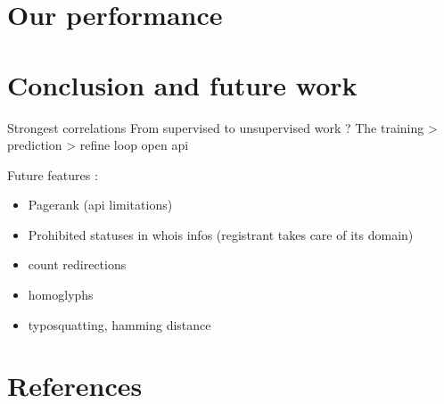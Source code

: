 \documentclass[conference,11pt]{IEEEtran}
\begin{document}
\section{Our performance}

\section{Conclusion and future work}
Strongest correlations
From supervised to unsupervised work ?
The training > prediction > refine loop
open api

Future features :
\begin{itemize}
  \item Pagerank (api limitations)
  \item Prohibited statuses in whois infos (registrant takes care of its domain)
  \item count redirections
  \item homoglyphs
  \item typosquatting, hamming distance
\end{itemize}
\section{References}



\end{document}
